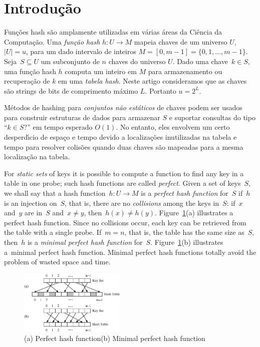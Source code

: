 \section{Introdu\c{c}\~ao}
\label{sec:introduction}
Fun\c{c}\~oes hash s\~ao amplamente utilizadas em v\'arias \'areas da
Ci\^encia da Computa\c{c}\~ao. 
Uma \textit{fun\c{c}\~ao hash} $h: U \to M$ mapeia chaves de um universo $U$, $|U|=u$, 
para um dado intervalo de inteiros $M=[0,m-1]=\{0,1,\dots,m-1\}$.
Seja~$S\subseteq U$ um subconjunto de $n$ chaves do universo $U$.
Dado uma chave~$k\in S$, uma fun\c{c}\~ao hash $h$ computa um inteiro em 
$M$ para armazenamento ou recupera\c{c}\~ao de $k$ em uma \textit{tabela hash}.
Neste artigo consideramos que as chaves s\~ao strings de bits de comprimento 
m\'aximo $L$. Portanto $u = 2^L$. 

M\'etodos de hashing para {\em conjuntos n\~ao est\'aticos} de chaves podem ser usados para
construir estruturas de dados para armazenar $S$ e suportar consultas do tipo
``$k \in S$?'' em tempo esperado $O(1)$.
No entanto, eles envolvem um certo desperd\'{\i}cio de espa\c{c}o e tempo devido
a localiza\c{c}\~oes inutilizadas na tabela e tempo para resolver colis\~oes quando duas
chaves s\~ao mapeadas para a mesma localiza\c{c}\~ao na tabela.


For {\em static sets} of keys it is possible to compute a function
to find any key in a table in one probe; such hash functions are called
\textit{perfect}. 
Given a set of keys~$S$, we shall say that a hash function~$h:U\to M$ is a
\textit{perfect hash function} for~$S$ if~$h$ is an injection on~$S$,
that is, there are no \textit{collisions} among the keys in~$S$: if~$x$
and~$y$ are in~$S$ and~$x\neq y$, then~$h(x)\neq h(y)$.
Figure~\ref{fig:minimalperfecthash-ph-mph}(a) illustrates a perfect hash
function.
Since no collisions occur, each key can be retrieved from the table
with a single probe.
If~$m=n$, that is, the table has the same size as~$S$,
then~$h$ is a \textit{minimal perfect hash function} for~$S$.
Figure~\ref{fig:minimalperfecthash-ph-mph}(b) illustrates
a~minimal perfect hash function.
Minimal perfect hash functions totally avoid the problem of wasted
space and time.

\begin{figure}
\centering
  \includegraphics[width=0.45\textwidth, height=0.3\textheight]{figs/minimalperfecthash-ph-mph.ps}
\caption{(a) Perfect hash function\quad  (b) Minimal perfect hash function}
\label{fig:minimalperfecthash-ph-mph}
\end{figure}

